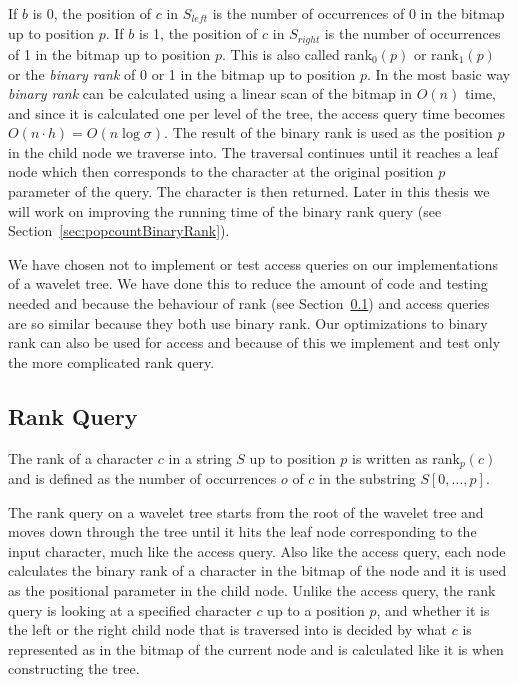 If $b$ is 0, the position of $c$ in $S_{\mathit{left}}$ is the number of occurrences of 0 in the bitmap up to position $p$.
If $b$ is 1, the position of $c$ in $S_{\mathit{right}}$ is the number of occurrences of 1 in the bitmap up to position $p$.
This is also called rank$_0(p)$ or rank$_1(p)$ or the \textit{binary rank} of 0 or 1 in the bitmap up to position $p$.
In the most basic way \textit{binary rank} can be calculated using a linear scan of the bitmap in $O(n)$ time, and since it is calculated one per level of the tree, the access query time becomes $O(n \cdot h) = O(n \log \sigma )$.
The result of the binary rank is used as the position $p$ in the child node we traverse into. 
The traversal continues  until it reaches a leaf node which then corresponds to the character at the original position $p$ parameter of the query.
The character is then returned.
Later in this thesis we will work on improving the running time of the binary rank query (see Section~\ref{sec:popcountBinaryRank}).

We have chosen not to implement or test access queries on our implementations of a wavelet tree.
We have done this to reduce the amount of code and testing needed and because the behaviour of rank (see Section~\ref{sec:rankDescription}) and access queries are so similar because they both use binary rank. 
Our optimizations to binary rank can also be used for access and because of this we implement and test only the more complicated rank query.

\subsection{Rank Query}
\label{sec:rankDescription}
The rank of a character $c$ in a string $S$ up to position $p$ is written as rank$_{p}(c)$ and is defined as the number of occurrences $o$ of $c$ in the substring $S[0, \ldots, p]$.

The rank query on a wavelet tree starts from the root of the wavelet tree and moves down through the tree until it hits the leaf node corresponding to the input character, much like the access query.
Also like the access query, each node calculates the binary rank of a character in the bitmap of the node and it is used as the positional parameter in the child node.
Unlike the access query, the rank query is looking at a specified character $c$ up to a position $p$, and whether it is the left or the right child node that is traversed into is decided by what $c$ is represented as in the bitmap of the current node and is calculated like it is when constructing the tree.

